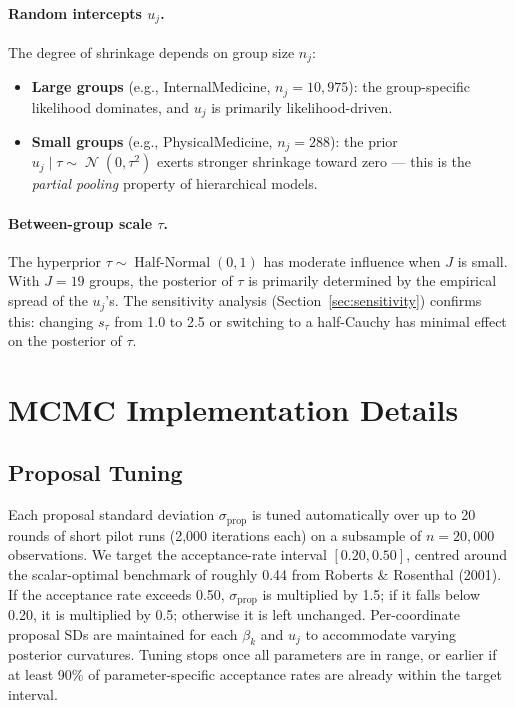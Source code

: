 \documentclass[11pt]{article}
\DeclareMathOperator{\Normal}{\mathcal{N}}
\DeclareMathOperator{\HalfNormal}{Half\text{-}Normal}
\begin{document}
\paragraph{Random intercepts $u_j$.}
The degree of shrinkage depends on group size $n_j$:
\begin{itemize}
  \item \textbf{Large groups} (e.g., InternalMedicine, $n_j = 10{,}975$):
    the group-specific likelihood dominates, and $u_j$ is primarily
    likelihood-driven.
  \item \textbf{Small groups} (e.g., PhysicalMedicine, $n_j = 288$):
    the prior $u_j \mid \tau \sim \Normal(0,\tau^2)$ exerts stronger
    shrinkage toward zero --- this is the \emph{partial pooling} property
    of hierarchical models.
\end{itemize}

\paragraph{Between-group scale $\tau$.}
The hyperprior $\tau \sim \HalfNormal(0,1)$ has moderate influence when
$J$ is small. With $J = 19$ groups, the posterior of $\tau$ is primarily
determined by the empirical spread of the $u_j$'s. The sensitivity
analysis (Section~\ref{sec:sensitivity}) confirms this: changing
$s_\tau$ from 1.0 to 2.5 or switching to a half-Cauchy has minimal
effect on the posterior of $\tau$.

\section{MCMC Implementation Details}
\label{sec:mcmc-details}

\subsection{Proposal Tuning}

Each proposal standard deviation $\sigma_{\text{prop}}$ is tuned
automatically over up to 20 rounds of short pilot runs (2,000 iterations
each) on a subsample of $n = 20{,}000$ observations. We target the
acceptance-rate interval $[0.20, 0.50]$, centred around the scalar-optimal
benchmark of roughly 0.44 from Roberts \& Rosenthal (2001). If the
acceptance rate exceeds 0.50, $\sigma_{\text{prop}}$ is multiplied by 1.5;
if it falls below 0.20, it is multiplied by 0.5; otherwise it is left
unchanged. Per-coordinate proposal SDs are maintained for each $\beta_k$
and $u_j$ to accommodate varying posterior curvatures. Tuning stops once
all parameters are in range, or earlier if at least 90\% of
parameter-specific acceptance rates are already within the target interval.
\end{document}
